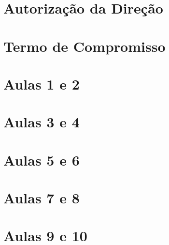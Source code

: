

\begin{apendicesenv}

    \partapendices %

    \chapter{Autorização da Direção} \label{ApendiceA.1} 
    \chapter{Termo de Compromisso} \label{ApendiceA.2} 

    \chapter{Aulas 1 e 2} \label{ApendiceB} 
    \chapter{Aulas 3 e 4} \label{ApendiceC} 
    \chapter{Aulas 5 e 6} \label{ApendiceD} 
    \chapter{Aulas 7 e 8} \label{ApendiceE} 
    \chapter{Aulas 9 e 10} \label{ApendiceF} 

\end{apendicesenv}

